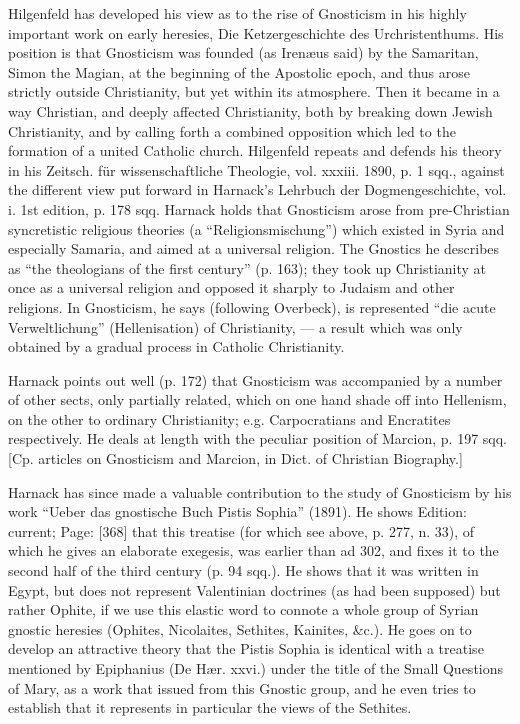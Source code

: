 
Hilgenfeld has developed his view as to the rise of Gnosticism in his highly important work on early heresies, Die Ketzergeschichte des Urchristenthums. His position is that Gnosticism was founded (as Irenæus said) by the Samaritan, Simon the Magian, at the beginning of the Apostolic epoch, and thus arose strictly outside Christianity, but yet within its atmosphere. Then it became in a way Christian, and deeply affected Christianity, both by breaking down Jewish Christianity, and by calling forth a combined opposition which led to the formation of a united Catholic church. Hilgenfeld repeats and defends his theory in his Zeitsch. für wissenschaftliche Theologie, vol. xxxiii. 1890, p. 1 sqq., against the different view put forward in Harnack\texthebrew{}’s Lehrbuch der Dogmengeschichte, vol. i. 1st edition, p. 178 sqq. Harnack holds that Gnosticism arose from pre-Christian syncretistic religious theories (a \texthebrew{“}Religionsmischung\texthebrew{}”) which existed in Syria and especially Samaria, and aimed at a universal religion. The Gnostics he describes as \texthebrew{“}the theologians of the first century\texthebrew{}” (p. 163); they took up Christianity at once as a universal religion and opposed it sharply to Judaism and other religions. In Gnosticism, he says (following Overbeck), is represented \texthebrew{“}die acute Verweltlichung\texthebrew{}” (Hellenisation) of Christianity, \texthebrew{—} a result which was only obtained by a gradual process in Catholic Christianity.

Harnack points out well (p. 172) that Gnosticism was accompanied by a number of other sects, only partially related, which on one hand shade off into Hellenism, on the other to ordinary Christianity; e.g. Carpocratians and Encratites respectively. He deals at length with the peculiar position of Marcion, p. 197 sqq. [Cp. articles on Gnosticism and Marcion, in Dict. of Christian Biography.]

Harnack has since made a valuable contribution to the study of Gnosticism by his work \texthebrew{“}Ueber das gnostische Buch Pistis Sophia\texthebrew{}” (1891). He shows Edition: current; Page: [368] that this treatise (for which see above, p. 277, n. 33), of which he gives an elaborate exegesis, was earlier than ad 302, and fixes it to the second half of the third century (p. 94 sqq.). He shows that it was written in Egypt, but does not represent Valentinian doctrines (as had been supposed) but rather Ophite, if we use this elastic word to connote a whole group of Syrian gnostic heresies (Ophites, Nicolaites, Sethites, Kainites, \&c.). He goes on to develop an attractive theory that the Pistis Sophia is identical with a treatise mentioned by Epiphanius (De Hær. xxvi.) under the title of the Small Questions of Mary, as a work that issued from this Gnostic group, and he even tries to establish that it represents in particular the views of the Sethites.

